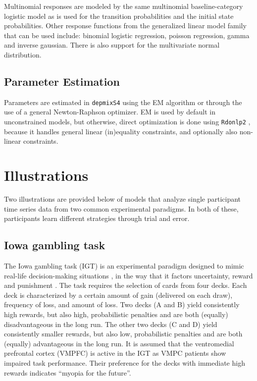 \documentclass[a4paper,12pt,man,english]{apa} %
\newcommand{\pkg}{\texttt}
\begin{document}
Multinomial responses are modeled by the same multinomial 
baseline-category logistic model as is used for the transition 
probabilities and the initial state probabilities. Other response 
functions from the generalized linear model family that can be used 
include: binomial logistic regression, poisson regression, gamma and 
inverse gaussian. There is also support for the multivariate normal 
distribution. 



\subsection{Parameter Estimation}

Parameters are estimated in \pkg{depmixS4} using the EM algorithm or
through the use of a general Newton-Raphson optimizer.  EM is used by
default in unconstrained models, but otherwise, direct optimization is
done using \pkg{Rdonlp2} \cite{Tamura2007,Spellucci2002}, because it
handles general linear (in)equality constraints, and optionally also
non-linear constraints.


\section{Illustrations}


Two illustrations are provided below of models that analyze single
participant time series data from two common experimental paradigms.
In both of these, participants learn different strategies through
trial and error.


\subsection{Iowa gambling task}

The Iowa gambling task (IGT) is an experimental paradigm designed to
mimic real-life decision-making situations \cite{Bechara1994}, in the
way that it factors uncertainty, reward and punishment
\cite{Dunn2006}.  The task requires the selection of cards from four
decks.  Each deck is characterized by a certain amount of gain
(delivered on each draw), frequency of loss, and amount of loss.  Two
decks (A and B) yield consistently high rewards, but also high,
probabilistic penalties and are both (equally) disadvantageous in the
long run.  The other two decks (C and D) yield consistently smaller
rewards, but also low, probabilistic penalties and are both (equally)
advantageous in the long run.  It is assumed that the ventromedial
prefrontal cortex (VMPFC) is active in the IGT as VMPC patients show
impaired task performance.  Their preference for the decks with
immediate high rewards indicates ``myopia for the future''.
\end{document}
